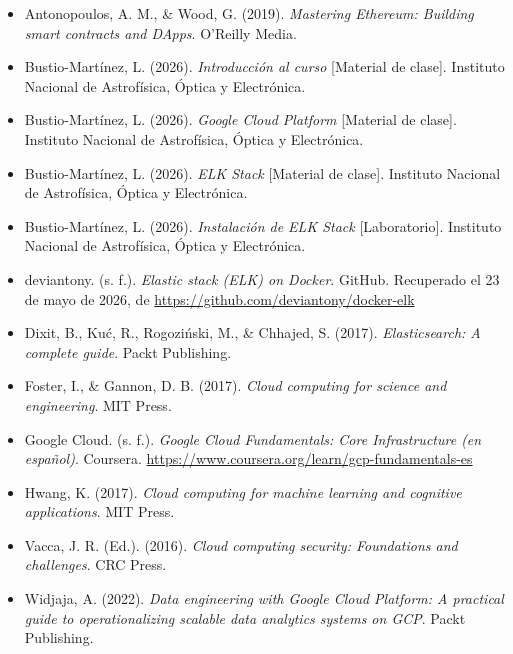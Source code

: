 \documentclass[
  coursetitle={Cómputo Nube y Tecnologías Emergentes},
  coursehours={96},
  coursedate={Verano 2026},
  doctype={Guía del curso},
  otherlangs={english,french},
  authorname={Lázaro},
  authorsurname={Bustio-Martínez},
  authortitle={PhD},
  role={Profesor Investigador},
  email={lbustio@inaoe.mx},
  phone={5559504000},
  ext={7459},
  institution={Instituto Nacional de Astrofísica, Óptica y Electrónica (INAOE)},
  department={Maestría en Ciencias en Tecnologías de Seguridad},
  address={Luis Enrique Erro 1, Sta. Ma. Tonantzintla, San Andrés Cholula, CP 72840, Puebla, México},
  margin={0.5in}
]{../../lbustio_lecture_notes}
\begin{document}
\begin{sloppypar}
\begin{itemize}[leftmargin=*]
  \item Antonopoulos, A. M., \& Wood, G. (2019). \textit{Mastering Ethereum: Building smart contracts and DApps}. O'Reilly Media.

  \item Bustio-Martínez, L. (2026). \textit{Introducción al curso} [Material de clase]. Instituto Nacional de Astrofísica, Óptica y Electrónica.

  \item Bustio-Martínez, L. (2026). \textit{Google Cloud Platform} [Material de clase]. Instituto Nacional de Astrofísica, Óptica y Electrónica.

  \item Bustio-Martínez, L. (2026). \textit{ELK Stack} [Material de clase]. Instituto Nacional de Astrofísica, Óptica y Electrónica.

  \item Bustio-Martínez, L. (2026). \textit{Instalación de ELK Stack} [Laboratorio]. Instituto Nacional de Astrofísica, Óptica y Electrónica.

  \item deviantony. (s. f.). \textit{Elastic stack (ELK) on Docker}. GitHub. Recuperado el 23 de mayo de 2026, de \url{https://github.com/deviantony/docker-elk}

  \item Dixit, B., Kuć, R., Rogoziński, M., \& Chhajed, S. (2017). \textit{Elasticsearch: A complete guide}. Packt Publishing.

  \item Foster, I., \& Gannon, D. B. (2017). \textit{Cloud computing for science and engineering}. MIT Press.

  \item Google Cloud. (s. f.). \textit{Google Cloud Fundamentals: Core Infrastructure (en español)}. Coursera. \url{https://www.coursera.org/learn/gcp-fundamentals-es}

  \item Hwang, K. (2017). \textit{Cloud computing for machine learning and cognitive applications}. MIT Press.

  \item Vacca, J. R. (Ed.). (2016). \textit{Cloud computing security: Foundations and challenges}. CRC Press.

  \item Widjaja, A. (2022). \textit{Data engineering with Google Cloud Platform: A practical guide to operationalizing scalable data analytics systems on GCP}. Packt Publishing.


\end{itemize}
\end{sloppypar}
\end{document}
